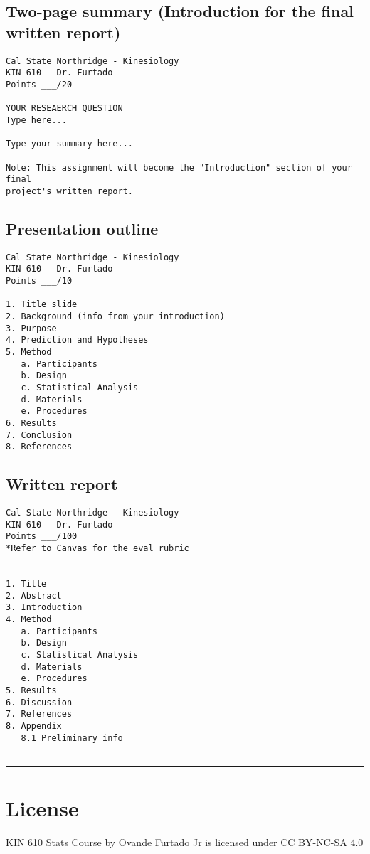 \documentclass[
]{article}
\begin{document}
\hypertarget{two-page-summary-introduction-for-the-final-written-report}{%
\subsection{Two-page summary (Introduction for the final written report)}\label{two-page-summary-introduction-for-the-final-written-report}}

\begin{verbatim}
Cal State Northridge - Kinesiology
KIN-610 - Dr. Furtado
Points ___/20

YOUR RESEAERCH QUESTION
Type here...

Type your summary here...

Note: This assignment will become the "Introduction" section of your final 
project's written report.
\end{verbatim}

\hypertarget{presentation-outline}{%
\subsection{Presentation outline}\label{presentation-outline}}

\begin{verbatim}
Cal State Northridge - Kinesiology
KIN-610 - Dr. Furtado
Points ___/10

1. Title slide
2. Background (info from your introduction)
3. Purpose
4. Prediction and Hypotheses
5. Method
   a. Participants
   b. Design
   c. Statistical Analysis
   d. Materials
   e. Procedures
6. Results
7. Conclusion
8. References
\end{verbatim}

\hypertarget{written-report}{%
\subsection{Written report}\label{written-report}}

\begin{verbatim}
Cal State Northridge - Kinesiology
KIN-610 - Dr. Furtado
Points ___/100
*Refer to Canvas for the eval rubric


1. Title
2. Abstract
3. Introduction
4. Method
   a. Participants
   b. Design
   c. Statistical Analysis
   d. Materials
   e. Procedures
5. Results
6. Discussion
7. References
8. Appendix
   8.1 Preliminary info
   
\end{verbatim}

\begin{center}\rule{0.5\linewidth}{0.5pt}\end{center}

\hypertarget{license}{%
\section{License}\label{license}}

KIN 610 Stats Course by Ovande Furtado Jr is licensed under CC BY-NC-SA 4.0
\end{document}
